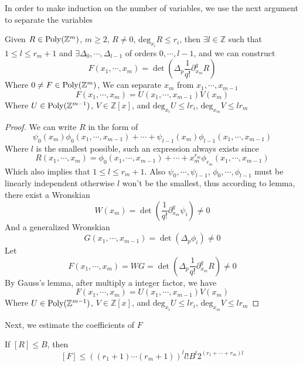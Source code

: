 In order to make induction on the number of variables, we use the next argument to separate the variables

\begin{lemma}\label{lemma36}
Given $ R \in \operatorname{Poly}(\mathbb{Z}^{m}) $, $ m \geq 2 $, $ R \neq 0 $, $ \mathrm{deg}_{x_{i}}R \leq r_{i} $, then $ \exists l \in \mathbb{Z} $ such that $ 1 \leq l \leq r_{m}+1 $ and $ \exists \Delta_{0},\cdots,\Delta_{l-1} $
of orders $ 0,\cdots,l-1 $, and we can construct
$$ F(x_{1},\cdots,x_{m}) = \det\left( \Delta_{p}\frac{1}{q!}\partial_{x_{m}}^{q} R \right) $$
Where $ 0 \neq F \in \operatorname{Poly}(\mathbb{Z}^{m}) $, We can separate $ x_{m} $ from $ x_{1},\cdots,x_{m-1} $
$$ F(x_{1},\cdots,x_{m}) = U(x_{1},\cdots,x_{m-1})V(x_{m}) $$
Where $ U \in \operatorname{Poly}(\mathbb{Z}^{m-1}) $, $ V \in \mathbb{Z}[x] $, and $ \mathrm{deg}_{x_{i}}U \leq lr_{i} $, $ \mathrm{deg}_{x_{m}}V \leq lr_{m} $
\end{lemma}

\begin{proof}
We can write $ R $ in the form of 
$$ \psi_{0}(x_{m})\phi_{0}(x_{1},\cdots,x_{m-1}) + \cdots + \psi_{l-1}(x_{m})\phi_{l-1}(x_{1},\cdots,x_{m-1}) $$
Where $ l $ is the smallest possible, such an expression always exists since
$$ R(x_{1},\cdots,x_{m}) = \phi_{0}(x_{1},\cdots,x_{m-1}) + \cdots + x_{m}^{r_{m}}\phi_{r_{m}}(x_{1},\cdots,x_{m-1}) $$
Which also implies that $ 1 \leq l \leq r_{m}+1 $. Also $ \psi_{0},\cdots,\psi_{l-1} $, $ \phi_{0},\cdots,\phi_{l-1} $ must be linearly independent otherwise $ l $ won't be the smallest, thus according to lemma, there exist a Wronskian 
$$ W(x_{m}) = \det\left( \frac{1}{q!}\partial_{x_{m}}^{q}\psi_{i} \right) \neq 0 $$
And a generalized Wronskian 
$$ G(x_{1},\cdots,x_{m-1}) = \det\left( \Delta_{p}\phi_{i} \right) \neq 0 $$
Let
$$ F(x_{1},\cdots,x_{m}) = WG = \det\left( \Delta_{p}\frac{1}{q!}\partial_{x_{m}}^{q} R \right) \neq 0 $$
By Gauss's lemma, after multiply a integer factor, we have
$$ F(x_{1},\cdots,x_{m}) = U(x_{1},\cdots,x_{m-1})V(x_{m}) $$
Where $ U \in \operatorname{Poly}(\mathbb{Z}^{m-1}) $, $ V \in \mathbb{Z}[x] $, and $ \mathrm{deg}_{x_{i}}U \leq lr_{i} $, $ \mathrm{deg}_{x_{m}}V \leq lr_{m} $
\end{proof}

Next, we estimate the coefficients of $ F $

\begin{lemma}\label{lemma 37}
If $ [R] \leq B $, then 
$$ [F] \leq \left( (r_{1}+1)\cdots(r_{m}+1) \right)^{l}l!B^{l}2^{(r_{1}+\cdots+r_{m})l} $$
\end{lemma}

